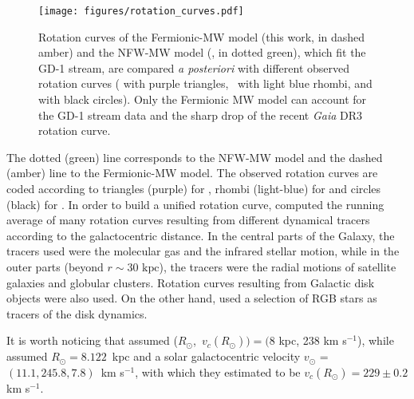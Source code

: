 \documentclass[referee]{aa} %
\begin{document}
\begin{figure}
   \centering
   \texttt{[image: figures/rotation\_curves.pdf]}
   \caption{Rotation curves of the Fermionic-MW model (this work, in dashed amber) and the NFW-MW model (\cite{2019MNRAS.486.2995M}, in dotted green), which fit the GD-1 stream, are compared \textit{a posteriori} with different observed rotation curves (\citealp{Eilers_2019} with purple triangles,~\citealp{sofue_2020} with light blue rhombi, and \citealp{Jiao2023} with black circles). Only the Fermionic MW model can account for the GD-1 stream data and the sharp drop of the recent \textit{Gaia} DR3 rotation curve.}
   \label{fig:rotcurve}
\end{figure}

The dotted (green) line corresponds to the NFW-MW model and the dashed (amber) line to the Fermionic-MW model.
The observed rotation curves are coded according to triangles (purple)
for \citet{Eilers_2019}, rhombi (light-blue) for \citet{sofue_2020} and
circles (black) for \citet{Jiao2023}.
In order to build a unified rotation curve, \citet{sofue_2020} computed the running average of many rotation curves resulting from different dynamical tracers according to the galactocentric distance. In the central parts of the Galaxy, the tracers used were the molecular gas and the infrared stellar motion, while in the outer parts (beyond $r\sim30 \textrm{~kpc}$), the tracers were the radial motions of satellite galaxies and globular clusters. Rotation curves resulting from Galactic disk objects were also used.
On the other hand, \citet{Eilers_2019} used a selection of RGB stars as tracers of the disk dynamics.

It is worth noticing  that \citet{sofue_2020} assumed
($R_\odot$,~$v_c(R_\odot))=(8$ kpc, 238 km s$^{-1}$), while \citet{Eilers_2019}
assumed $R_\odot=8.122$~kpc and a solar galactocentric velocity $v_\odot$ = $(11.1, 245.8, 7.8)$~km s$^{-1}$,
with which they estimated to be $v_c(R_\odot)=229\pm0.2$ km s$^{-1}$.
\end{document}
